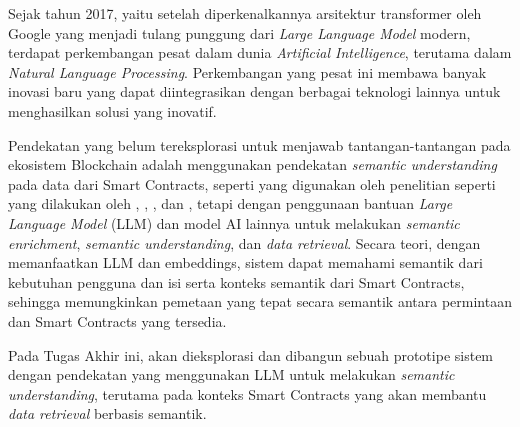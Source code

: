 Sejak tahun 2017, yaitu setelah diperkenalkannya arsitektur transformer oleh Google yang menjadi tulang punggung dari \textit{Large Language Model} modern, terdapat perkembangan pesat dalam dunia \textit{Artificial Intelligence}, terutama dalam \textit{Natural Language Processing}. Perkembangan yang pesat ini membawa banyak inovasi baru yang dapat diintegrasikan dengan berbagai teknologi lainnya untuk menghasilkan solusi yang inovatif.

Pendekatan yang belum tereksplorasi untuk menjawab tantangan-tantangan pada ekosistem Blockchain adalah menggunakan pendekatan \textit{semantic understanding} pada data dari Smart Contracts, seperti yang digunakan oleh penelitian seperti yang dilakukan oleh \cite{third2017linked}, \cite{shi2021semantic}, \cite{stan}, dan \cite{sopek2018graphchain}, tetapi dengan penggunaan bantuan \textit{Large Language Model} (LLM) dan model AI lainnya untuk melakukan \textit{semantic enrichment}, \textit{semantic understanding}, dan \textit{data retrieval}. Secara teori, dengan memanfaatkan LLM dan embeddings, sistem dapat memahami semantik dari kebutuhan pengguna dan isi serta konteks semantik dari Smart Contracts, sehingga memungkinkan pemetaan yang tepat secara semantik antara permintaan dan Smart Contracts yang tersedia.


Pada Tugas Akhir ini, akan dieksplorasi dan dibangun sebuah prototipe sistem dengan pendekatan yang menggunakan LLM untuk melakukan \textit{semantic understanding}, terutama pada konteks Smart Contracts yang akan membantu \textit{data retrieval} berbasis semantik.



